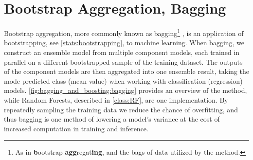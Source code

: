 \section{Bootstrap Aggregation, \texorpdfstring{\ie}{ie} Bagging}
\label{ml_general:bagging}

Bootstrap aggregation, more commonly known as bagging\footnote{As in
\textbf{b}ootstrap \textbf{agg}regat\textbf{ing},
and the bags of data utilized by the method.} \cite{Breiman1996},
is an application of bootstrapping, see \cref{stats:bootstrapping}, to machine learning.
When bagging, we construct an ensemble model from multiple component models,
each trained in parallel on a different bootstrapped sample of the training dataset.
The outputs of the component models are then aggregated into one ensemble result,
taking the mode predicted class (mean value) when working with classification (regression) models.
\cref{fig:bagging_and_boosting:bagging} provides an overview of the method,
while Random Forests, described in \cref{class:RF}, are one implementation.
By repeatedly sampling the training data we reduce the chance of overfitting,
and thus bagging is one method of lowering a model's variance
at the cost of increased computation in training and inference.

